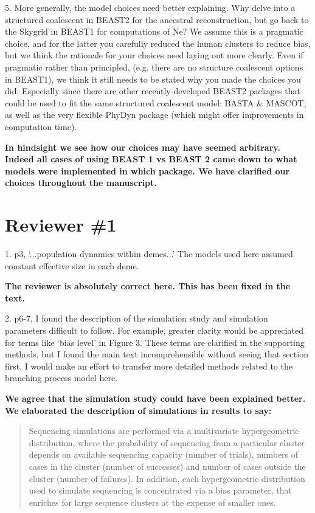 \documentclass[11pt,oneside,letterpaper]{article}
\begin{document}
5. More generally, the model choices need better explaining. Why delve into a structured coalescent in BEAST2 for the ancestral reconstruction, but go back to the Skygrid in BEAST1 for computations of Ne? We assume this is a pragmatic choice, and for the latter you carefully reduced the human clusters to reduce bias, but we think the rationale for your choices need laying out more clearly. Even if pragmatic rather than principled, (e.g. there are no structure coalescent options in BEAST1), we think it still needs to be stated why you made the choices you did. Especially since there are other recently-developed BEAST2 packages that could be used to fit the same structured coalescent model: BASTA \& MASCOT, as well as the very flexible PhyDyn package (which might offer improvements in computation time).

\textbf{In hindsight we see how our choices may have seemed arbitrary. Indeed all cases of using BEAST 1 vs BEAST 2 came down to what models were implemented in which package. We have clarified our choices throughout the manuscript.}

%

\section*{Reviewer \#1}

1. p3, `...population dynamics within demes...'
The models used here assumed constant effective size in each deme.

\textbf{The reviewer is absolutely correct here. This has been fixed in the text.}

2. p6-7, I found the description of the simulation study and simulation parameters difficult to follow. For example, greater clarity would be appreciated for terms like `bias level' in Figure 3.
These terms are clarified in the supporting methods, but I found the main text incomprehensible without seeing that section first. I would make an effort to transfer more detailed methods related to the branching process model here.

\textbf{We agree that the simulation study could have been explained better. We elaborated the description of simulations in results to say:}

\begin{quotation}
Sequencing simulations are performed via a multivariate hypergeometric distribution, where the probability of sequencing from a particular cluster depends on available sequencing capacity (number of trials), numbers of cases in the cluster (number of successes) and number of cases outside the cluster (number of failures).
In addition, each hypergeometric distribution used to simulate sequencing is concentrated via a bias parameter, that enriches for large sequence clusters at the expense of smaller ones.
\end{quotation}
\end{document}

